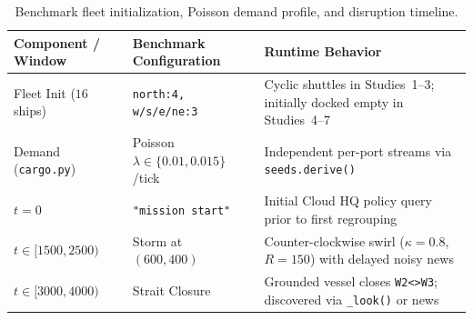 \documentclass[11pt,a4paper,oneside]{report}
\begin{document}
\begin{table}[H]
\centering
\caption[Benchmark fleet, demand, and disruption schedule]{Benchmark fleet initialization, Poisson demand profile, and disruption timeline.}
\label{tab:fleet-events}
\begin{tabularx}{\textwidth}{@{}ll>{\raggedright\arraybackslash}X@{}}
\toprule
\textbf{Component / Window} & \textbf{Benchmark Configuration} & \textbf{Runtime Behavior} \\
\midrule
Fleet Init ($16$ ships) & \texttt{north:4, w/s/e/ne:3} & Cyclic shuttles in Studies~1--3; initially docked empty in Studies~4--7 \\
Demand (\texttt{cargo.py}) & Poisson $\lambda \in \{0.01, 0.015\}$/tick & Independent per-port streams via \texttt{seeds.derive()} \\
$t = 0$ & \texttt{"mission start"} & Initial Cloud HQ policy query prior to first regrouping \\
$t \in [1500, 2500)$ & Storm at $(600, 400)$ & Counter-clockwise swirl ($\kappa=0.8$, $R=150$) with delayed noisy news \\
$t \in [3000, 4000)$ & Strait Closure & Grounded vessel closes \texttt{W2<>W3}; discovered via \texttt{\_look()} or news \\
\bottomrule
\end{tabularx}
\end{table}

\begin{table}[H]
\centering
\caption[Directed corridor transit properties]{Key directed corridor transit properties in \texttt{scenario.py} under cruise speed $v_c = 1.8$ (calm $t=0$ vs.\ storm peak $t=1800$).}
\label{tab:lane-asymmetry}
\end{table}
\end{document}
